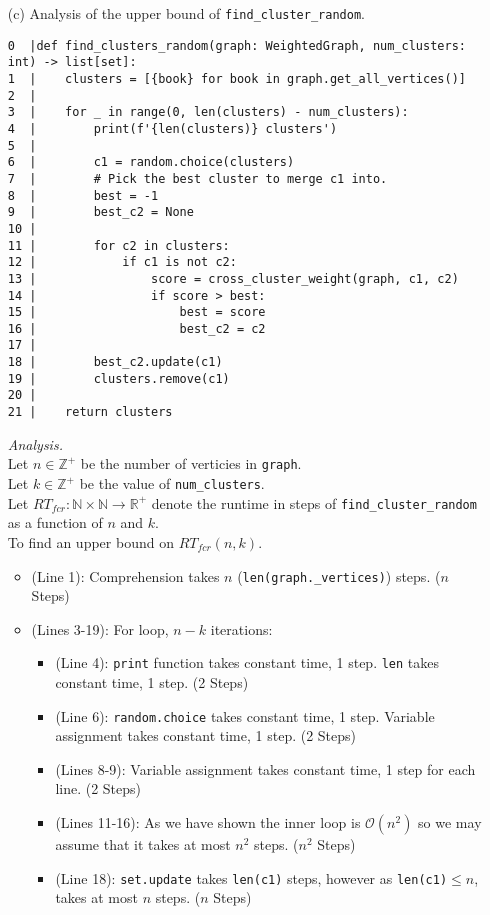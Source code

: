 \documentclass[11pt]{article}
\newcommand{\Z}{\mathbb{Z}}
\newcommand{\cO}{\mathcal{O}}
\begin{document}
\begin{enumerate}
\begin{enumerate}
\item[(c)]
Analysis of the upper bound of \texttt{find\_cluster\_random}.
\begin{verbatim}
0  |def find_clusters_random(graph: WeightedGraph, num_clusters: int) -> list[set]:
1  |    clusters = [{book} for book in graph.get_all_vertices()]
2  |
3  |    for _ in range(0, len(clusters) - num_clusters):
4  |        print(f'{len(clusters)} clusters')
5  |
6  |        c1 = random.choice(clusters)
7  |        # Pick the best cluster to merge c1 into.
8  |        best = -1
9  |        best_c2 = None
10 |
11 |        for c2 in clusters:
12 |            if c1 is not c2:
13 |                score = cross_cluster_weight(graph, c1, c2)
14 |                if score > best:
15 |                    best = score
16 |                    best_c2 = c2
17 |
18 |        best_c2.update(c1)
19 |        clusters.remove(c1)
20 |
21 |    return clusters
\end{verbatim}
\textit{Analysis.}\\
Let $n \in \Z^+$ be the number of verticies in \texttt{graph}.\\
Let $k \in \Z^+$ be the value of \texttt{num\_clusters}.\\
Let $RT_{fcr} : \mathbb{N} \times \mathbb{N} \to \mathbb{R}^+$ denote the runtime in steps of \texttt{find\_cluster\_random} as a function of $n$ and $k$.\\
To find an upper bound on $RT_{fcr}(n, k)$.
\begin{itemize}
    \item (Line 1): Comprehension takes $n$ (\texttt{len(graph.\_vertices)}) steps. ($n$ Steps)
    \item (Lines 3-19): For loop, $n - k$ iterations:
    \begin{itemize}
        \item (Line 4): \texttt{print} function takes constant time, 1 step.  \texttt{len} takes constant time, 1 step. (2 Steps)
        \item (Line 6): \texttt{random.choice} takes constant time, 1 step. Variable assignment takes constant time, 1 step. (2 Steps)
        \item (Lines 8-9): Variable assignment takes constant time, 1 step for each line. (2 Steps)
        \item (Lines 11-16): As we have shown the inner loop is $\cO (n^2)$ so we may assume that it takes at most $n^2$ steps. ($n^2$ Steps)
        \item (Line 18): \texttt{set.update} takes \texttt{len(c1)} steps, however as \texttt{len(c1)}$\leq n$, takes at most $n$ steps. ($n$ Steps)

\end{itemize}
\end{itemize}
\end{enumerate}
\end{enumerate}
\end{document}

